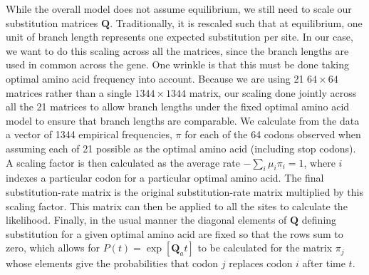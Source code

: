 \documentclass{article}
\newcommand{\Pij}{\ensuremath{\pi_{j}}\xspace}
\newcommand{\Qmatrix}{\mathbf{Q}\xspace}
\newcommand{\Qmatrixa}{\ensuremath{\Qmatrix_a}\xspace}
\begin{document}
While the overall model does not assume equilibrium, we still need to scale our substitution matrices $\Qmatrix$.
Traditionally, it is rescaled such that at equilibrium, one unit of branch length represents one expected substitution per site.
In our case, we want to do this scaling across all the matrices, since the branch lengths are used in common across the gene.
One wrinkle is that this must be done taking optimal amino acid frequency into account. 
Because we are using 21 $64 \times 64$ matrices rather than a single $1344 \times 1344$ matrix, our scaling done jointly across all the 21 matrices to allow branch lengths under the fixed optimal amino acid model to ensure that branch lengths are comparable.
We calculate from the data a vector of 1344 empirical frequencies, $\pi$ for each of the 64 codons observed when assuming each of 21 possible as the optimal amino acid (including stop codons).
A scaling factor is then calculated as the average rate $-\sum_i \mu_i \pi_i=1$, where $i$ indexes a particular codon for a particular optimal amino acid.
The final substitution-rate matrix is the original substitution-rate matrix multiplied by this scaling factor.
This matrix can then be applied to all the sites to calculate the likelihood. 
Finally, in the usual manner the diagonal elements of $\Qmatrix$ defining substitution for a given optimal amino acid are fixed so that the rows sum to zero, which allows for $P(t) = \exp\left[\Qmatrixa t\right]$ to be calculated for the matrix $\Pij$ whose elements give the probabilities that codon $j$ replaces codon $i$ after time $t$. 
\end{document}
